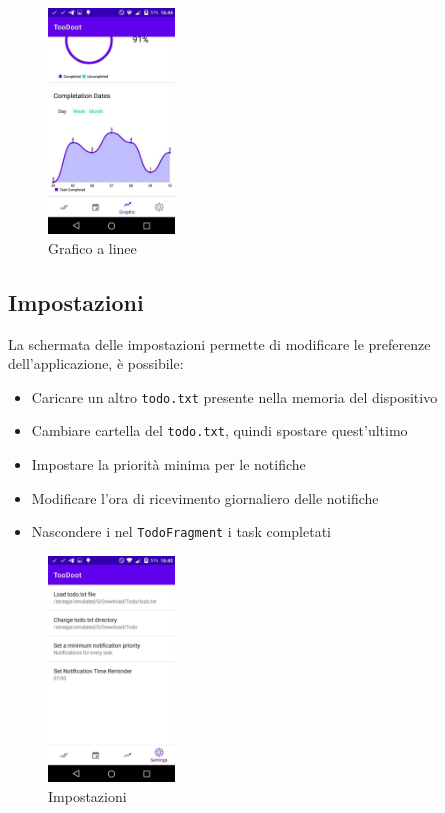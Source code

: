 \documentclass[]{article}
\providecommand{\tightlist}{%
  \setlength{\itemsep}{0pt}\setlength{\parskip}{0pt}}
\begin{document}
\begin{figure}
\centering
\includegraphics[width=0.3\textwidth,height=0.1\textheight]{./img/grafico_linee.jpg}
\caption{Grafico a linee}
\end{figure}

\hypertarget{impostazioni}{%
\subsection{Impostazioni}\label{impostazioni}}

La schermata delle impostazioni permette di modificare le preferenze
dell'applicazione, è possibile:

\begin{itemize}
\tightlist
\item
  Caricare un altro \texttt{todo.txt} presente nella memoria del
  dispositivo
\item
  Cambiare cartella del \texttt{todo.txt}, quindi spostare quest'ultimo
\item
  Impostare la priorità minima per le notifiche
\item
  Modificare l'ora di ricevimento giornaliero delle notifiche
\item
  Nascondere i nel \texttt{TodoFragment} i task completati
\end{itemize}

\begin{figure}
\centering
\includegraphics[width=0.3\textwidth,height=0.1\textheight]{./img/impostazioni.jpg}
\caption{Impostazioni}
\end{figure}
\end{document}

